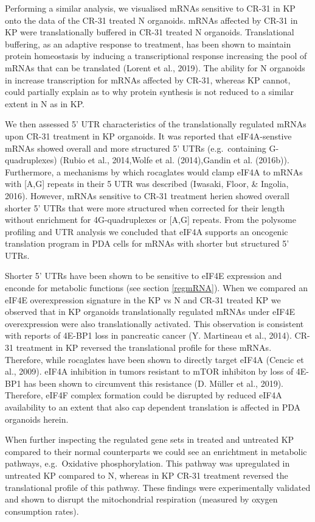 \documentclass[12pt,openany]{book}
\begin{document}
Performing a similar analysis, we visualised mRNAs sensitive to CR-31 in
KP onto the data of the CR-31 treated N organoids. mRNAs affected by
CR-31 in KP were translationally buffered in CR-31 treated N organoids.
Translational buffering, as an adaptive response to treatment, has been
shown to maintain protein homeostasis by inducing a transcriptional
response increasing the pool of mRNAs that can be translated (Lorent et
al., 2019). The ability for N organoids in increase transcription for
mRNAs affected by CR-31, whereas KP cannot, could partially explain as
to why protein synthesis is not reduced to a similar extent in N as in
KP.

We then assessed 5' UTR characteristics of the translationally regulated
mRNAs upon CR-31 treatment in KP organoids. It was reported that
eIF4A-senstive mRNAs showed overall and more structured 5' UTRs
(e.g.~containing G-quadruplexes) (Rubio et al., 2014,Wolfe et al.
(2014),Gandin et al. (2016b)). Furthermore, a mechanisms by which
rocaglates would clamp eIF4A to mRNAs with {[}A,G{]} repeats in their 5
UTR was described (Iwasaki, Floor, \& Ingolia, 2016). However, mRNAs
sensitive to CR-31 treatment herien showed overall shorter 5' UTRs that
were more structured when corrected for their length without enrichment
for 4G-quadruplexes or {[}A,G{]} repeats. From the polysome profiling
and UTR analysis we concluded that eIF4A supports an oncogenic
translation program in PDA cells for mRNAs with shorter but structured
5' UTRs.

Shorter 5' UTRs have been shown to be sensitive to eIF4E expression and
enconde for metabolic functions (see section \ref{regmRNA}). When we
compared an eIF4E overexpression signature in the KP vs N and CR-31
treated KP we observed that in KP organoids translationally regulated
mRNAs under eIF4E overexpression were also translationally activated.
This observation is consistent with reports of 4E-BP1 loss in pancreatic
cancer (Y. Martineau et al., 2014). CR-31 treatment in KP reversed the
translational profile for these mRNAs. Therefore, while rocaglates have
been shown to directly target eIF4A (Cencic et al., 2009). eIF4A
inhibition in tumors resistant to mTOR inhibiton by loss of 4E-BP1 has
been shown to circumvent this resistance (D. Müller et al., 2019).
Therefore, eIF4F complex formation could be disrupted by reduced eIF4A
availability to an extent that also cap dependent translation is
affected in PDA organoids herein.

When further inspecting the regulated gene sets in treated and untreated
KP compared to their normal counterparts we could see an enrichtment in
metabolic pathways, e.g.~Oxidative phosphorylation. This pathway was
upregulated in untreated KP compared to N, whereas in KP CR-31 treatment
reversed the translational profile of this pathway. These findings were
experimentally validated and shown to disrupt the mitochondrial
respiration (measured by oxygen consumption rates).
\end{document}
